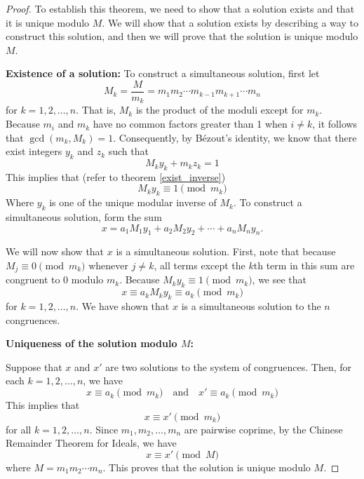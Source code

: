         \begin{proof}
            To establish this theorem, we need to show that a solution exists and that it is unique modulo $M$. We will show that a solution exists by describing a way to construct this solution, and then we will prove that the solution is unique modulo $M$.
            
            \textbf{Existence of a solution:}
            To construct a simultaneous solution, first let
            $$M_k = \frac{M}{m_k} = m_1m_2 \cdots m_{k-1}m_{k+1} \cdots m_n$$
            for $k = 1, 2, \ldots, n$. That is, $M_k$ is the product of the moduli except for $m_k$. Because $m_i$ and $m_k$ have no common factors greater than 1 when $i \neq k$, it follows that $\gcd(m_k, M_k) = 1$. Consequently, by Bézout's identity, we know that there exist integers $y_k$ and $z_k$ such that
            $$M_ky_k + m_kz_k = 1$$
            This implies that (refer to theorem \ref{exist_inverse})
            $$M_ky_k \equiv 1 \pmod{m_k}$$
            Where $y_k$ is one of the unique modular inverse of $M_k$.
            To construct a simultaneous solution, form the sum
            $$x = a_1M_1y_1 + a_2M_2y_2 + \cdots + a_nM_ny_n.$$
            
            We will now show that $x$ is a simultaneous solution. First, note that because $M_j \equiv 0 \pmod{m_k}$ whenever $j \neq k$, all terms except the $k$th term in this sum are congruent to 0 modulo $m_k$. Because $M_ky_k \equiv 1 \pmod{m_k}$, we see that
            $$x \equiv a_kM_ky_k \equiv a_k \pmod{m_k}$$
            for $k = 1, 2, \ldots, n$. We have shown that $x$ is a simultaneous solution to the $n$ congruences.
            
            \textbf{Uniqueness of the solution modulo $M$:}
            
            Suppose that $x$ and $x'$ are two solutions to the system of congruences. Then, for each $k = 1, 2, \ldots, n$, we have
            $$x \equiv a_k \pmod{m_k} \quad \text{and} \quad x' \equiv a_k \pmod{m_k}$$
            This implies that
            $$x \equiv x' \pmod{m_k}$$
            for all $k = 1, 2, \ldots, n$. Since $m_1, m_2, \ldots, m_n$ are pairwise coprime, by the Chinese Remainder Theorem for Ideals, we have
            $$x \equiv x' \pmod{M}$$
            where $M = m_1m_2 \cdots m_n$. This proves that the solution is unique modulo $M$.
            \end{proof}

